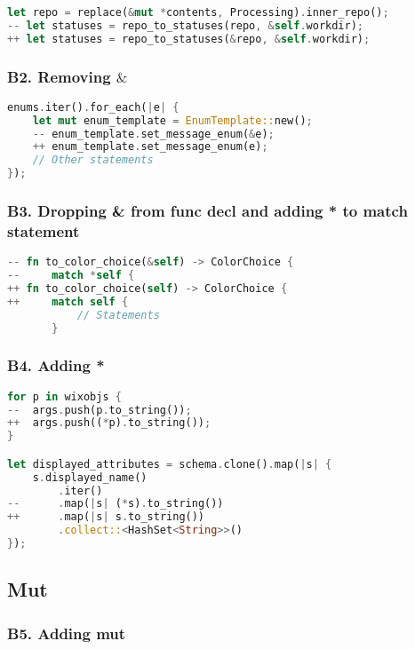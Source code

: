 \documentclass{article}
\begin{document}
\begin{lstlisting}[language=Rust, style=colouredRust, label={l3}]
let repo = replace(&mut *contents, Processing).inner_repo();
-- let statuses = repo_to_statuses(repo, &self.workdir);
++ let statuses = repo_to_statuses(&repo, &self.workdir);
\end{lstlisting}


\subsubsection{B2. Removing $\&$}


\begin{lstlisting}[language=Rust, style=colouredRust, label={l3}]
enums.iter().for_each(|e| {
    let mut enum_template = EnumTemplate::new();
    -- enum_template.set_message_enum(&e);
    ++ enum_template.set_message_enum(e);
    // Other statements
});
\end{lstlisting}


\subsubsection{B3. Dropping \& from func decl and adding * to match statement}

\begin{lstlisting}[language=Rust, style=colouredRust, label={l3}]
-- fn to_color_choice(&self) -> ColorChoice {
--     match *self {
++ fn to_color_choice(self) -> ColorChoice {
++     match self {
           // Statements
       }
\end{lstlisting}

\subsubsection{B4. Adding *}

\begin{lstlisting}[language=Rust, style=colouredRust, label={l3}]
for p in wixobjs {
--  args.push(p.to_string());
++  args.push((*p).to_string());
}

let displayed_attributes = schema.clone().map(|s| {
    s.displayed_name()
        .iter()
--      .map(|s| (*s).to_string())
++      .map(|s| s.to_string())
        .collect::<HashSet<String>>()
});
\end{lstlisting}

\subsection{Mut}
\subsubsection{B5. Adding mut}
\end{document}
